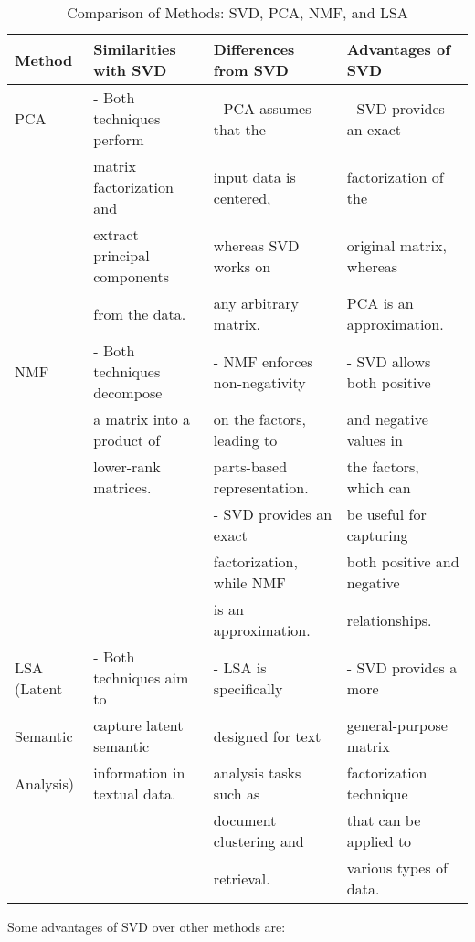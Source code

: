 \documentclass[a4paper]{article}
\begin{document}
{		\begin{table}[htbp]
			\begin{center}
				\renewcommand{\arraystretch}{1.5} %
				\caption{Comparison of Methods: SVD, PCA, NMF, and LSA}
				\label{tab:method-comparison}
				\begin{tabular}{|l|l|l|l|}
					\hline
					\textbf{Method} & \textbf{Similarities with SVD} & \textbf{Differences from SVD} & \textbf{Advantages of SVD} \\
					\hline
					PCA & - Both techniques perform & - PCA assumes that the & - SVD provides an exact \\
					& matrix factorization and & input data is centered, & factorization of the \\
					& extract principal components & whereas SVD works on & original matrix, whereas \\
					& from the data. & any arbitrary matrix. & PCA is an approximation. \\
					\hline
					NMF & - Both techniques decompose & - NMF enforces non-negativity & - SVD allows both positive \\
					& a matrix into a product of & on the factors, leading to & and negative values in \\
					& lower-rank matrices. & parts-based representation. & the factors, which can \\
					& & - SVD provides an exact & be useful for capturing \\
					& & factorization, while NMF & both positive and negative \\
					& & is an approximation. & relationships. \\
					\hline
					LSA (Latent & - Both techniques aim to & - LSA is specifically & - SVD provides a more \\
					Semantic & capture latent semantic & designed for text & general-purpose matrix \\
					Analysis) & information in textual data. & analysis tasks such as & factorization technique \\
					& & document clustering and & that can be applied to \\
					& & retrieval. & various types of data. \\
					\hline
				\end{tabular}
			\end{center}
		\end{table}
		
		
		Some advantages of SVD over other methods are:
		
}
\end{document}
